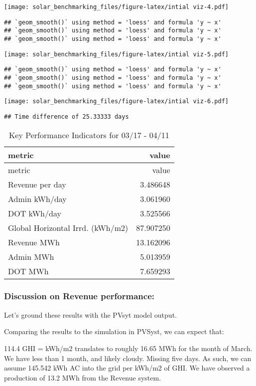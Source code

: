 \documentclass[]{article}
\begin{document}
\texttt{[image: solar\_benchmarking\_files/figure-latex/intial viz-4.pdf]}

\begin{verbatim}
## `geom_smooth()` using method = 'loess' and formula 'y ~ x'
## `geom_smooth()` using method = 'loess' and formula 'y ~ x'
## `geom_smooth()` using method = 'loess' and formula 'y ~ x'
\end{verbatim}

\texttt{[image: solar\_benchmarking\_files/figure-latex/intial viz-5.pdf]}

\begin{verbatim}
## `geom_smooth()` using method = 'loess' and formula 'y ~ x'
## `geom_smooth()` using method = 'loess' and formula 'y ~ x'
## `geom_smooth()` using method = 'loess' and formula 'y ~ x'
\end{verbatim}

\texttt{[image: solar\_benchmarking\_files/figure-latex/intial viz-6.pdf]}

\begin{verbatim}
## Time difference of 25.33333 days
\end{verbatim}

\begin{longtable}[]{@{}lr@{}}
\caption{Key Performance Indicators for 03/17 - 04/11}\tabularnewline
\toprule
metric & value\tabularnewline
\midrule
\endfirsthead
\toprule
metric & value\tabularnewline
\midrule
\endhead
Revenue per day & 3.486648\tabularnewline
Admin kWh/day & 3.061960\tabularnewline
DOT kWh/day & 3.525566\tabularnewline
Global Horizontal Irrd. (kWh/m2) & 87.907250\tabularnewline
Revenue MWh & 13.162096\tabularnewline
Admin MWh & 5.013959\tabularnewline
DOT MWh & 7.659293\tabularnewline
\bottomrule
\end{longtable}

\subsubsection{Discussion on Revenue
performance:}\label{discussion-on-revenue-performance}

Let's ground these results with the PVsyt model output.

Comparing the results to the simulation in PVSyst, we can expect that:

114.4 GHI = kWh/m2 translates to roughly 16.65 MWh for the month of
March. We have less than 1 month, and likely cloudy. Missing five days.
As such, we can assume 145.542 kWh AC into the grid per kWh/m2 of GHI.
We have observed a production of 13.2 MWh from the Revenue system.
\end{document}
